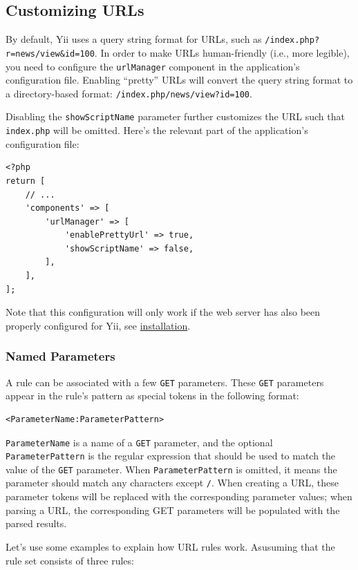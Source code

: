 \subsection{Customizing URLs}
By default, Yii uses a query string format for URLs, such as \lstinline|/index.php?r=news/view&id=100|. In order to make URLs
human-friendly (i.e., more legible), you need to configure the \lstinline|urlManager| component in the application's configuration
file. Enabling ``pretty'' URLs will convert the query string format to a directory-based format: \lstinline|/index.php/news/view?id=100|.

Disabling the \lstinline|showScriptName| parameter further customizes the URL such that \lstinline|index.php| will be omitted. Here's the relevant part of
the application's configuration file:

\lstset{language=php}\begin{lstlisting}
<?php
return [
    // ...
    'components' => [
        'urlManager' => [
            'enablePrettyUrl' => true,
            'showScriptName' => false,
        ],
    ],
];
\end{lstlisting}
Note that this configuration will only work if the web server has also been properly configured for Yii, see
\hyperref[start-installation.md::recommended-apache-configuration]{installation}.

\subsubsection{Named Parameters}
A rule can be associated with a few \lstinline|GET| parameters. These \lstinline|GET| parameters appear in the rule's pattern as special tokens in the following format:

\begin{lstlisting}
<ParameterName:ParameterPattern>
\end{lstlisting}
\lstinline|ParameterName| is a name of a \lstinline|GET| parameter, and the optional \lstinline|ParameterPattern| is the regular expression that should
be used to match the value of the \lstinline|GET| parameter. When \lstinline|ParameterPattern| is omitted, it means the parameter
should match any characters except \lstinline|/|. When creating a URL, these parameter tokens will be replaced with the
corresponding parameter values; when parsing a URL, the corresponding GET parameters will be populated with the parsed results.

Let's use some examples to explain how URL rules work. Asusuming that the rule set consists of three rules:

